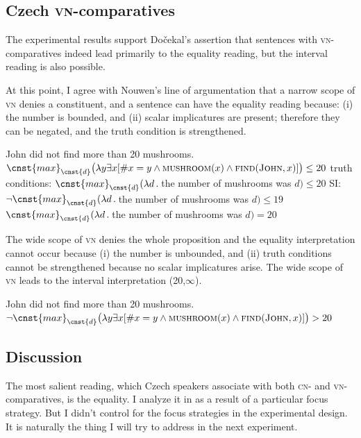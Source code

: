 \documentclass[output=paper,
]{langscibook}
\begin{document}
\subsection{Czech \textsc{vn-}comparatives}

The experimental results support Dočekal's assertion that sentences with \textsc{vn-}comparati\-ves indeed lead primarily to the equality reading, but the interval reading is also possible.

At this point, I agree with Nouwen's line of argumentation that a narrow scope of \textsc{vn}  denies a constituent, and a sentence can have the equality reading because: (i) the number is bounded, and (ii) scalar implicatures are present; therefore they can be negated, and the truth condition is strengthened. 

\ea  John did not find more than 20 mushrooms. 
	\ea $\cnst{max}_{\cnst{d}}\big(\lambda y\exists x[\#x=y \wedge \textsc{mushroom}(x) \wedge \textsc{find}(\textsc{John},x)]\big) \leq 20$ \label{ex:e_exh}
 \ex truth conditions: $\cnst{max}_{\cnst{d}}(\lambda d\,.\,$the number of mushrooms was $d)\leq 20$ \label{ex:tc}
	\ex SI: $\neg\cnst{max}_{\cnst{d}}(\lambda d\,.\,$the number of mushrooms was $d)\leq 19$ \label{ex:si}
	\ex $\cnst{max}_{\cnst{d}}(\lambda d\,.\,$the number of mushrooms was $d) = 20$ \label{ex:max}
\z
\z

\noindent The wide scope of \textsc{vn}  denies the whole proposition and the equality interpretation cannot occur because (i) the number is unbounded, and (ii) truth conditions cannot be strengthened because no scalar implicatures arise. The wide scope of \textsc{vn} leads to the interval interpretation (20,$\infty$).

\ea  John did not find more than 20 mushrooms. 
\ea $\neg \cnst{max}_{\cnst{d}}\big(\lambda y\exists x[\#x=y \wedge \textsc{mushroom}(x) \wedge \textsc{find}(\textsc{John},x)]\big) > 20$ \label{ex:e_int}
\z
\z

\subsection{Discussion}

The most salient reading, which Czech speakers associate with both \textsc{cn-} and \textsc{vn-}compa\-ratives, is the equality. I analyze it in  as a result of a particular focus strategy. But I didn't control for the focus strategies in the experimental design. It is naturally the thing I will try to address in the next experiment.
\end{document}
